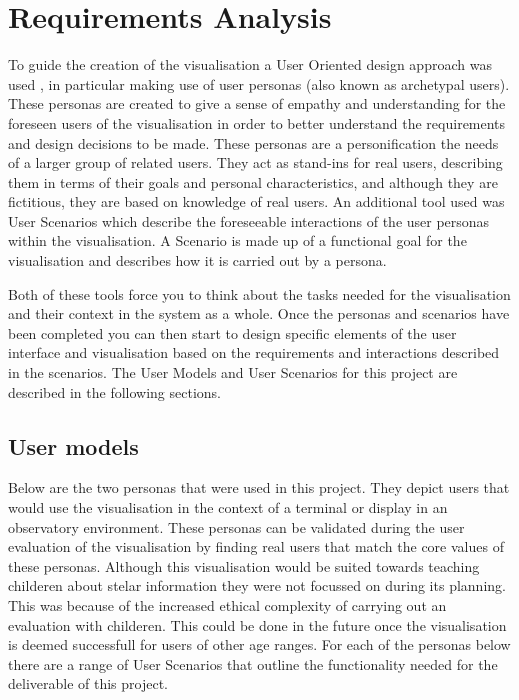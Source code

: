 \chapter{Requirements Analysis}\label{Chap:ra}
To guide the creation of the visualisation a User Oriented design approach was
used \cite{AboutFace3}, in particular making use of user personas (also known as
archetypal users). These personas are
created to give a sense of empathy and understanding for the foreseen users of
the visualisation in order to better understand the requirements and design
decisions to be made. These personas are a personification the
needs of a larger group of related users. They act as stand-ins for
real users, describing them in terms of their goals and personal
characteristics, and although they are fictitious, they are based on knowledge
of real users. An additional tool used was User Scenarios which
describe the foreseeable interactions of the user personas within the
visualisation. A Scenario is made up of a functional goal for the visualisation
and describes how it is carried out by a persona. 

Both of these tools force you
to think about the tasks needed for the visualisation and their context in the
system as a whole. Once the personas and scenarios have been completed you can
then start to design specific elements of the user interface and visualisation
based on the requirements and interactions described in the scenarios. The User
Models and User Scenarios for this project are described in the following
sections.


\section{User models}
Below are the two personas that were used
in this project. They depict users that would use the visualisation in the
context
of a terminal or display in an observatory environment. These personas can be
validated during the user evaluation of the visualisation by finding real users
that
match the core values of these personas. Although this visualisation would be
suited towards teaching childeren about stelar information they were not
focussed on during its planning. This was because of the increased ethical
complexity of carrying out an evaluation with childeren. This could be done in
the future once the visualisation is deemed successfull for users of other age
ranges. 
For each of the personas below there are a range of User Scenarios that outline the functionality needed for the deliverable of this project.

